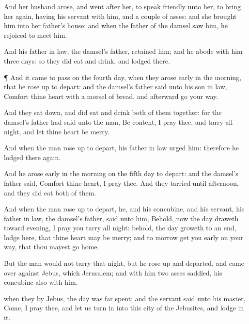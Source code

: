 {And her
husband
arose, and
went
after her, to
speak
friendly unto her,
{} to bring her
again, having his
servant with him, and a
couple of
asses: and she
brought him into her
father’s
house: and when the
father of the
damsel
saw him, he
rejoiced to
meet him.

And his father in
law, the
damsel’s
father,
retained him; and he
abode with him
three
days: so they did
eat and
drink, and
lodged there.


\par }{\PP {}¶ And it came to pass on the
fourth
day, when they arose
early in the
morning, that he rose
up to
depart: and the
damsel’s
father
said unto his son in
law,
Comfort thine
heart with a
morsel of
bread, and
afterward go your
way.

And they sat
down, and did
eat and
drink
both of them
together: for the
damsel’s
father had
said unto the
man, Be
content, I pray thee, and tarry all
night, and let thine
heart be
merry.

And when the
man rose
up to
depart, his father in
law
urged him: therefore he
lodged there
again.

And he arose
early in the
morning on the
fifth
day to
depart: and the
damsel’s
father
said,
Comfort thine
heart, I pray thee. And they
tarried until
afternoon, and they did
eat
both of them.

And when the
man rose
up to
depart, he, and his
concubine, and his
servant, his father in
law, the
damsel’s
father,
said unto him, Behold, now the
day
draweth toward
evening, I pray you tarry all
night: behold, the
day groweth to an
end,
lodge here, that thine
heart may be
merry; and to
morrow get you
early on your
way, that thou mayest
go
home.

But the
man
would not tarry that
night, but he rose
up and
departed, and
came over
against
Jebus, which
{}
Jerusalem; and
{} with him
two
asses
saddled, his
concubine also
{} with him.

 when they
{} by
Jebus, the
day was
far
spent; and the
servant
said unto his
master,
Come, I pray thee, and let us turn
in into this
city of the
Jebusites, and
lodge in it.

}
